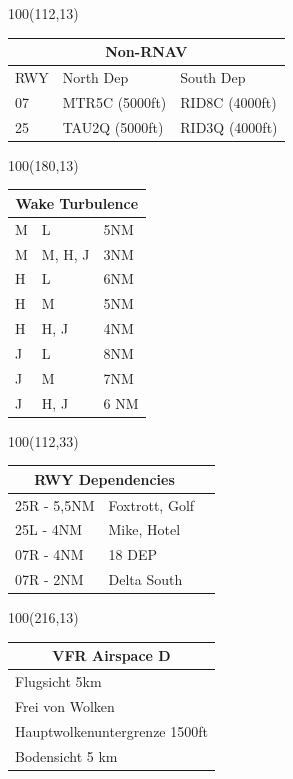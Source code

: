 \documentclass[10pt,landscape,a4paper]{article}
\begin{document}
\begin{textblock}{100}(112,13)
\begin{table}[]
\begin{tabular}{|l|l|l|}
\multicolumn{3}{c}{\textbf{Non-RNAV}} \\ \hline
RWY & North Dep & South Dep \\ \hline
07  & MTR5C (5000ft)    & RID8C (4000ft)   \\ \hline
25  & TAU2Q (5000ft) & RID3Q (4000ft)   \\ \hline
\end{tabular}
\end{table}
\end{textblock}
\begin{textblock}{100}(180,13)
\begin{table}[]
\begin{tabular}{|l|l|l|}
\multicolumn{3}{c}{\textbf{Wake Turbulence}} \\ \hline
 M  & L  & 5NM   \\ \hline
 M  & M, H, J  & 3NM   \\ \hline
 H  & L & 6NM   \\ \hline
 H  & M & 5NM   \\ \hline
 H  & H, J & 4NM \\ \hline
 J &  L & 8NM \\ \hline
 J &  M & 7NM \\ \hline
 J &  H, J  & 6 NM   \\ \hline
\end{tabular}
\end{table}
\end{textblock}
\begin{textblock}{100}(112,33)
\begin{table}[]
\begin{tabular}{|l|l|l|}
\multicolumn{2}{c}{\textbf{RWY Dependencies}} \\ \hline
25R - 5,5NM &   Foxtrott, Golf\\ \hline
25L - 4NM &   Mike, Hotel\\ \hline
07R - 4NM &  {18 DEP}\\ \hline
07R - 2NM &  Delta South\\ \hline
\end{tabular}
\end{table}
\end{textblock}
\begin{textblock}{100}(216,13)
\begin{table}[]
\begin{tabular}{|l|}
\multicolumn{1}{c}{\textbf{VFR Airspace D}} \\ \hline
 Flugsicht 5km   \\ \hline
Frei von Wolken   \\ \hline
Hauptwolkenuntergrenze 1500ft \\ \hline
Bodensicht 5 km \\ \hline
\end{tabular}
\end{table}
\end{textblock}
\end{document}
